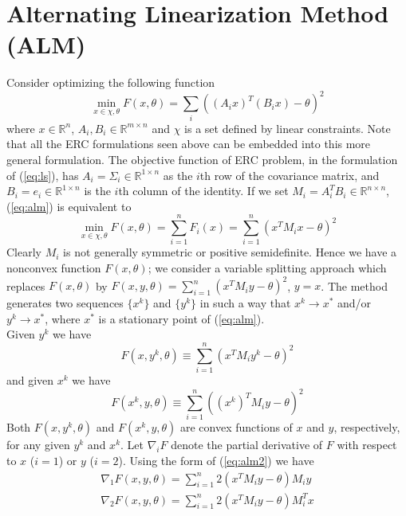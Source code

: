 {\section{Alternating Linearization Method (ALM)}
Consider optimizing the following function
\begin{equation}\label{eq:alm}
\min_{x \in \chi, \theta} F(x,\theta) = \sum_{i} ((A_i x)^T(B_i x) -\theta)^2
\end{equation}
where $x \in \mathbb{R}^n $, $A_i, B_i \in \mathbb{R}^{m \times n} $ and $\chi$ is a set defined by linear constraints. Note that all the ERC formulations seen above can be embedded into this more general formulation. The objective function of ERC problem, in the formulation of (\ref{eq:ls}), has $A_i = \Sigma_i \in \mathbb{R}^{1 \times n} $ as the $i$th row of the covariance matrix, and $B_i = e_i \in \mathbb{R}^{1 \times n} $ is the $i$th column of the identity. If we set $M_i = A_i^TB_i \in \mathbb{R}^{n \times n}$, (\ref{eq:alm}) is equivalent to
\begin{equation}\label{eq:alm2}
\min_{x \in \chi, \theta} F(x,\theta) = \sum_{i=1}^n F_i(x) = \sum_{i=1}^n (x^TM_ix - \theta)^2
\end{equation}
Clearly $M_i$ is not generally symmetric or positive semidefinite. Hence we have a nonconvex function $F(x,\theta)$; we consider a variable splitting approach which replaces $F(x,\theta)$ by $F(x,y,\theta) = \sum_{i=1}^n (x^TM_iy - \theta)^2$, $y=x$. The method generates two sequences $\{x^k\}$ and $\{y^k\}$ in such a way that $x^k \rightarrow x^*$ and/or $y^k \rightarrow x^*$, where $x^*$ is a stationary point of (\ref{eq:alm}).\\
Given $y^k$ we have
\begin{equation}
F(x,y^k,\theta) \equiv \sum_{i=1}^n (x^TM_iy^k - \theta)^2
\end{equation}
and given $x^k$ we have
\begin{equation}
F(x^k,y,\theta) \equiv \sum_{i=1}^n ((x^k)^TM_iy - \theta)^2
\end{equation}
Both $F(x,y^k,\theta)$ and $F(x^k,y,\theta)$ are convex functions of $x$ and $y$, respectively, for any given $y^k$ and $x^k$. Let $\nabla_iF$ denote the partial derivative of $F$ with respect to $x$ ($i=1$) or $y$ ($i=2$). Using the form of (\ref{eq:alm2}) we have
\begin{equation}
\begin{split}
\nabla_1F(x,y,\theta) = \sum_{i=1}^n 2(x^TM_iy-\theta)M_iy \\
\nabla_2F(x,y,\theta) = \sum_{i=1}^n 2(x^TM_iy-\theta)M_i^Tx

\end{split}
\end{equation}}
